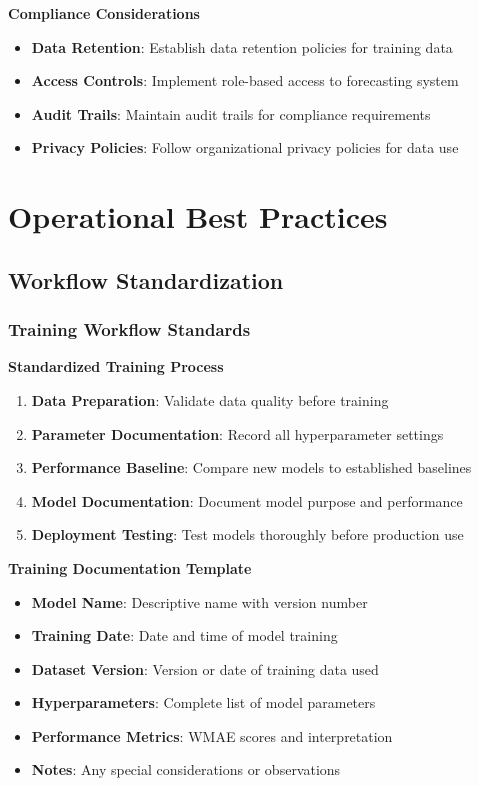\textbf{Compliance Considerations}
\begin{itemize}
	\item \textbf{Data Retention}: Establish data retention policies for training data
	\item \textbf{Access Controls}: Implement role-based access to forecasting system
	\item \textbf{Audit Trails}: Maintain audit trails for compliance requirements
	\item \textbf{Privacy Policies}: Follow organizational privacy policies for data use
\end{itemize}

\section{Operational Best Practices}

\subsection{Workflow Standardization}

\subsubsection{Training Workflow Standards}

\textbf{Standardized Training Process}
\begin{enumerate}
	\item \textbf{Data Preparation}: Validate data quality before training
	\item \textbf{Parameter Documentation}: Record all hyperparameter settings
	\item \textbf{Performance Baseline}: Compare new models to established baselines
	\item \textbf{Model Documentation}: Document model purpose and performance
	\item \textbf{Deployment Testing}: Test models thoroughly before production use
\end{enumerate}

\textbf{Training Documentation Template}
\begin{itemize}
	\item \textbf{Model Name}: Descriptive name with version number
	\item \textbf{Training Date}: Date and time of model training
	\item \textbf{Dataset Version}: Version or date of training data used
	\item \textbf{Hyperparameters}: Complete list of model parameters
	\item \textbf{Performance Metrics}: WMAE scores and interpretation
	\item \textbf{Notes}: Any special considerations or observations
\end{itemize}

